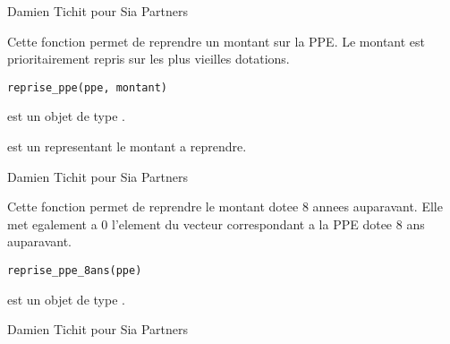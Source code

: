 \documentclass[a4paper]{book}
\begin{document}
%
\begin{Author}\relax
Damien Tichit pour Sia Partners
\end{Author}
%
\begin{Description}\relax
Cette fonction permet de reprendre un montant sur la PPE. Le montant est prioritairement repris sur les plus vieilles dotations.
\end{Description}
%
\begin{Usage}
\begin{verbatim}
reprise_ppe(ppe, montant)
\end{verbatim}
\end{Usage}
%
\begin{Arguments}
\begin{ldescription}
\item[\code{ppe}] est un objet de type .

\item[\code{montant}] est un  representant le montant a reprendre.
\end{ldescription}
\end{Arguments}
%
\begin{Author}\relax
Damien Tichit pour Sia Partners
\end{Author}
%
\begin{Description}\relax
Cette fonction permet de reprendre le montant dotee 8 annees auparavant. Elle met egalement a 0 l'element du vecteur correspondant a la PPE dotee 8 ans auparavant.
\end{Description}
%
\begin{Usage}
\begin{verbatim}
reprise_ppe_8ans(ppe)
\end{verbatim}
\end{Usage}
%
\begin{Arguments}
\begin{ldescription}
\item[\code{ppe}] est un objet de type .
\end{ldescription}
\end{Arguments}
%
\begin{Author}\relax
Damien Tichit pour Sia Partners
\end{Author}
\end{document}
